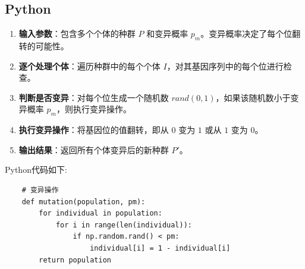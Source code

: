 \documentclass[journal,twoside,web]{ieeecolor}
\begin{document}
\subsection{Python}
\begin{enumerate}
    \item \textbf{输入参数}：包含多个个体的种群 $P$ 和变异概率 $p_m$。变异概率决定了每个位翻转的可能性。
    \item \textbf{逐个处理个体}：遍历种群中的每个个体 $I$，对其基因序列中的每个位进行检查。
    \item \textbf{判断是否变异}：对每个位生成一个随机数 $rand(0, 1)$，如果该随机数小于变异概率 $p_m$，则执行变异操作。
    \item \textbf{执行变异操作}：将基因位的值翻转，即从 $0$ 变为 $1$ 或从 $1$ 变为 $0$。
    \item \textbf{输出结果}：返回所有个体变异后的新种群 $P'$。
\end{enumerate}

Python代码如下:
\begin{lstlisting}
    # 变异操作
    def mutation(population, pm):
        for individual in population:
            for i in range(len(individual)):
                if np.random.rand() < pm:
                    individual[i] = 1 - individual[i]
        return population
\end{lstlisting}
\end{document}
